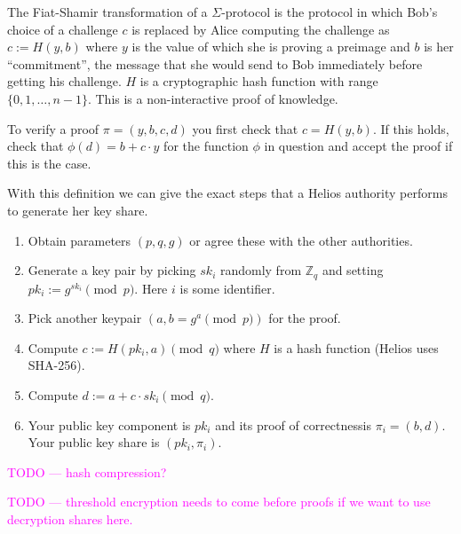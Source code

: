 \documentclass{llncs}
\begin{document}
\begin{definition}
The Fiat-Shamir transformation of a $\Sigma$-protocol is the protocol in which
Bob's choice of a challenge $c$ is replaced by Alice computing the challenge as
$c := H(y, b)$ where $y$ is the value of which she is proving a preimage and $b$
is her ``commitment'', the message that she would send to Bob immediately before
getting his challenge. $H$ is a cryptographic hash function with range $\{0, 1,
\ldots, n-1\}$. This is a non-interactive proof of knowledge.

To verify a proof $\pi = (y, b, c, d)$ you first check that $c = H(y, b)$. If
this holds, check that $\phi(d) = b + c\cdot y$ for the function $\phi$ in
question and accept the proof if this is the case.
\end{definition}

With this definition we can give the exact steps that a Helios authority
performs to generate her key share.
\begin{enumerate}
\item Obtain parameters $(p, q, g)$ or agree these with the other authorities.
\item Generate a key pair by picking $sk_i$ randomly from $\mathbb Z_q$ and
setting $pk_i := g^{sk_i} \pmod{p}$. Here $i$ is some identifier.
\item Pick another keypair $(a, b = g^a \pmod{p})$ for the proof.
\item Compute $c := H(pk_i, a) \pmod{q}$ where $H$ is a hash function (Helios
uses SHA-256).
\item Compute $d := a + c \cdot sk_i \pmod{q}$.
\item Your public key component is $pk_i$ and its proof of
correctness\footnotemark is $\pi_i = (b, d)$. Your public key share is
$(pk_i, \pi_i)$.
\end{enumerate}

\textcolor{Fuchsia}{TODO --- hash compression?}

\textcolor{Fuchsia}{TODO --- threshold encryption needs to come before proofs if
we want to use decryption shares here.}
\end{document}
